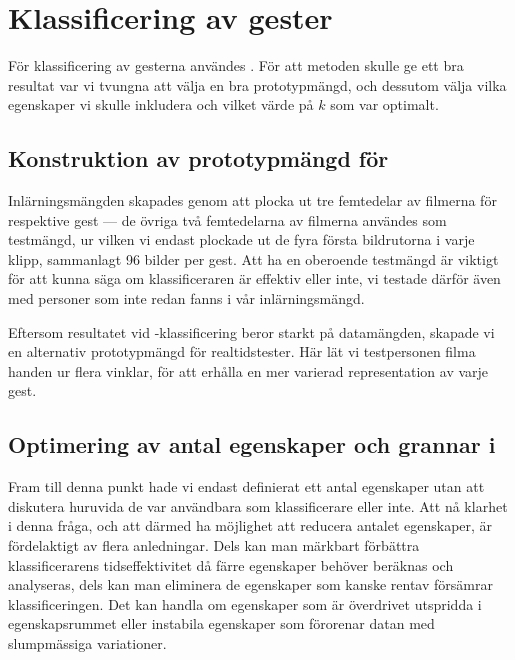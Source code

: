 \documentclass[../rapport_MVEX01-11-05]{subfiles}
\begin{document}
\section{Klassificering av gester} 

För klassificering av gesterna användes \knn. För att metoden skulle
ge ett bra resultat var vi tvungna att välja
en bra prototypmängd, och dessutom välja vilka egenskaper vi skulle inkludera
och vilket värde på $k$ som var optimalt.

\subsection{Konstruktion av prototypmängd för \knn}
Inlärningsmängden skapades genom att plocka ut tre femtedelar av filmerna för
respektive gest --- de övriga två femtedelarna av filmerna 
användes som testmängd, ur vilken vi endast plockade ut
de fyra första bildrutorna i varje klipp, sammanlagt 96 bilder per gest.
Att ha en oberoende testmängd är viktigt för att kunna säga om klassificeraren är
effektiv eller inte, vi testade därför även med personer som inte redan 
fanns i vår inlärningsmängd.

Eftersom resultatet vid \knn-klassificering beror starkt på datamängden,
skapade vi en alternativ prototypmängd för realtidstester.
Här lät vi testpersonen filma handen ur flera vinklar,
för att erhålla en mer varierad representation av varje gest.

\subsection{Optimering av antal egenskaper och grannar i \knn}
Fram till denna punkt hade vi endast definierat ett antal egenskaper utan att
diskutera huruvida de var användbara som klassificerare eller inte. Att nå
klarhet i denna fråga, och att därmed ha möjlighet att reducera antalet
egenskaper, är
fördelaktigt av flera anledningar. Dels kan man märkbart förbättra
klassificerarens
tidseffektivitet då färre egenskaper behöver beräknas och analyseras, dels kan man
eliminera de egenskaper som kanske rentav försämrar klassificeringen.
Det kan handla om egenskaper som är överdrivet utspridda i
egenskapsrummet eller instabila egenskaper som förorenar datan med slumpmässiga
variationer.
\end{document}
